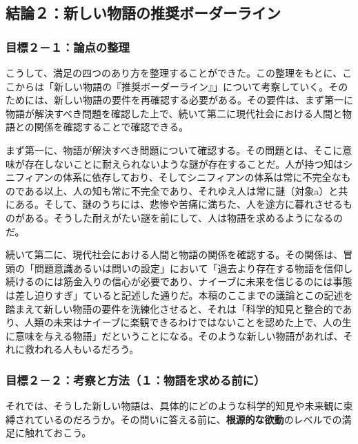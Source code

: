 \subsection{結論２：新しい物語の推奨ボーダーライン}\label{ux7d50ux8ad6uxff12ux65b0ux3057ux3044ux7269ux8a9eux306eux63a8ux5968ux30dcux30fcux30c0ux30fcux30e9ux30a4ux30f3}

\subsubsection{目標２－１：論点の整理}\label{ux76eeux6a19uxff12uxff11ux8ad6ux70b9ux306eux6574ux7406}

こうして、満足の四つのあり方を整理することができた。この整理をもとに、ここからは「新しい物語の『推奨ボーダーライン』」について考察していく。そのためには、新しい物語の要件を再確認する必要がある。その要件は、まず第一に物語が解決すべき問題を確認した上で、続いて第二に現代社会における人間と物語との関係を確認することで確認できる。

まず第一に、物語が解決すべき問題について確認する。その問題とは、そこに意味が存在しないことに耐えられないような謎が存在することだ。人が持つ知はシニフィアンの体系に依存しており、そしてシニフィアンの体系は常に不完全なものである以上、人の知も常に不完全であり、それゆえ人は常に謎（対象a）と共にある。そして、謎のうちには、悲惨や苦痛に満ちた、人を途方に暮れさせるものがある。そうした耐えがたい謎を前にして、人は物語を求めるようになるのだ。

続いて第二に、現代社会における人間と物語の関係を確認する。その関係は、冒頭の「問題意識あるいは問いの設定」において「過去より存在する物語を信仰し続けるのには筋金入りの信心が必要であり、ナイーブに未来を信じるのには事態は差し迫りすぎ」ていると記述した通りだ。本稿のここまでの議論とこの記述を踏まえて新しい物語の要件を洗練化させると、それは「科学的知見と整合的であり、人類の未来はナイーブに楽観できるわけではないことを認めた上で、人の生に意味を与える物語」だということになる。そのような新しい物語があれば、それに救われる人もいるだろう。

\subsubsection{目標２－２：考察と方法（１：物語を求める前に）}\label{ux76eeux6a19uxff12uxff12ux8003ux5bdfux3068ux65b9ux6cd5uxff11ux7269ux8a9eux3092ux6c42ux3081ux308bux524dux306b}

それでは、そうした新しい物語は、具体的にどのような科学的知見や未来観に束縛されているのだろうか。その問いに答える前に、\textbf{根源的な欲動}のレベルでの満足に触れておこう。

